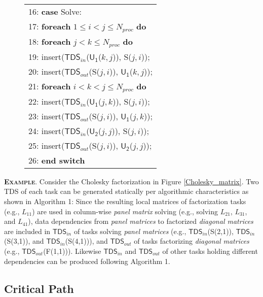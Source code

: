 \documentclass[12pt]{elsarticle}
\begin{document}
\begin{figure}
\begin{tabular}{@{}p{\columnwidth}@{}}
16: \quad \textbf{case} \textsf{Solve}:\\
17: \quad\quad \textbf{foreach} $1 \leq i < j \leq N_{proc}$ \textbf{do}\\
18: \quad\quad\quad \textbf{foreach} $j < k \leq N_{proc}$ \textbf{do}\\
19: \quad\quad\quad\quad \textsf{insert($\mathsf{TDS}_{in}$($\mathsf{U_1}$($k,j$)), S($j,i$));}\\20: \quad\quad\quad\quad \textsf{insert($\mathsf{TDS}_{out}$(S($j,i$)), $\mathsf{U_1}$($k,j$));}\\
21: \quad\quad\quad \textbf{foreach} $i < k < j \leq N_{proc}$ \textbf{do}\\
22: \quad\quad\quad\quad \textsf{insert($\mathsf{TDS}_{in}$($\mathsf{U_1}$($j,k$)), S($j,i$));}\\23: \quad\quad\quad\quad \textsf{insert($\mathsf{TDS}_{out}$(S($j,i$)), $\mathsf{U_1}$($j,k$));}\\
24: \quad\quad\quad \textsf{insert($\mathsf{TDS}_{in}$($\mathsf{U_2}$($j,j$)), S($j,i$));}\\25: \quad\quad\quad \textsf{insert($\mathsf{TDS}_{out}$(S($j,i$)), $\mathsf{U_2}$($j,j$));}\\
26: \textbf{end switch}\\
\midrule
\end{tabular}
\end{figure}

\vspace{1mm}
\noindent\textsc{\textbf{Example}}. Consider the Cholesky factorization in Figure \ref{Cholesky_matrix}. Two TDS of each task can be generated statically per algorithmic characteristics as shown in Algorithm 1: Since the resulting local matrices of factorization tasks (e.g., $L_{11}$) are used in column-wise \emph{panel matrix} solving (e.g., solving $L_{21}$, $L_{31}$, and $L_{41}$), data dependencies from \emph{panel matrices} to factorized \emph{diagonal matrices} are included in $\mathsf{TDS}_{in}$ of tasks solving \emph{panel matrices} (e.g., $\mathsf{TDS}_{in}$\textsf{(S(2,1))}, $\mathsf{TDS}_{in}$\textsf{(S(3,1))}, and $\mathsf{TDS}_{in}$\textsf{(S(4,1))}), and $\mathsf{TDS}_{out}$ of tasks factorizing \emph{diagonal matrices} (e.g., $\mathsf{TDS}_{out}$\textsf{(F(1,1))}). Likewise $\mathsf{TDS}_{in}$ and $\mathsf{TDS}_{out}$ of other tasks holding different dependencies can be produced following Algorithm 1.

\subsection{Critical Path}
\end{document}
